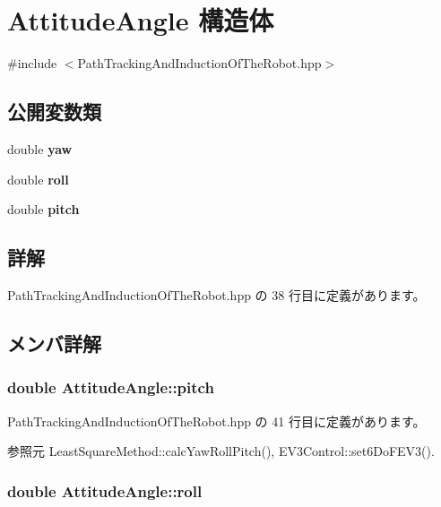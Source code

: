 \section{Attitude\-Angle 構造体}
\label{struct_attitude_angle}


{\ttfamily \#include $<$Path\-Tracking\-And\-Induction\-Of\-The\-Robot.\-hpp$>$}

\subsection*{公開変数類}
\begin{DoxyCompactItemize}
\item 
double {\bf yaw}
\item 
double {\bf roll}
\item 
double {\bf pitch}
\end{DoxyCompactItemize}


\subsection{詳解}


 Path\-Tracking\-And\-Induction\-Of\-The\-Robot.\-hpp の 38 行目に定義があります。



\subsection{メンバ詳解}
\subsubsection[{pitch}]{\setlength{\rightskip}{0pt plus 5cm}double Attitude\-Angle\-::pitch}\label{struct_attitude_angle_ad8f6b5c2dc91fff26166d9b8516abf2c}


 Path\-Tracking\-And\-Induction\-Of\-The\-Robot.\-hpp の 41 行目に定義があります。



参照元 Least\-Square\-Method\-::calc\-Yaw\-Roll\-Pitch(), E\-V3\-Control\-::set6\-Do\-F\-E\-V3().

\subsubsection[{roll}]{\setlength{\rightskip}{0pt plus 5cm}double Attitude\-Angle\-::roll}\label{struct_attitude_angle_ae41ffc4738b93a5ce00141fb8b535c74}


